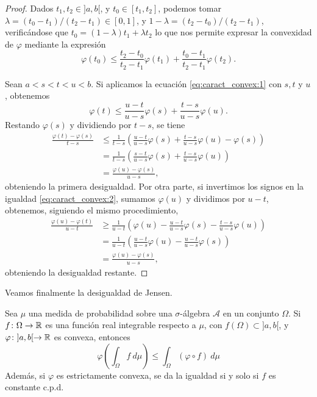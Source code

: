 \documentclass{book}
\begin{document}
\begin{proof}
	Dados $t_1,t_2 \in ]a,b[$, y $t_0 \in [t_1,t_2]$, podemos tomar $\lambda = (t_0 - t_1)/(t_2 - t_1) \in [0,1]$, y $1- \lambda = (t_2 - t_0)/(t_2 - t_1)$, verificándose que $t_0 = (1 - \lambda)t_1 + \lambda t_2$ lo que nos permite expresar la convexidad de $\varphi$ mediante la expresión
	\begin{equation} \label{eq:caract_convex:1}
		\varphi(t_0) \le \frac{t_2 - t_0}{t_2 - t_1}\varphi(t_1)+\frac{t_0 - t_1}{t_2 - t_1}\varphi(t_2). 
	\end{equation}

	Sean $a < s < t < u < b$. Si aplicamos la ecuación \ref{eq:caract_convex:1} con $s,t$ y $u$, obtenemos
	\begin{equation} \label{eq:caract_convex:2}
		\varphi(t) \le \frac{u - t}{u-s}\varphi(s) + \frac{t-s}{u-s}\varphi(u).
	\end{equation}
	Restando $\varphi(s)$ y dividiendo por $t-s$, se tiene
	\begin{align*}
		\frac{\varphi(t)-\varphi(s)}{t-s} &\le  \frac{1}{t-s}\left(\frac{u - t}{u-s}\varphi(s) + \frac{t-s}{u-s}\varphi(u) - \varphi(s)\right) \\
					&= \frac{1}{t-s}\left(\frac{s-t}{u-s}\varphi(s) + \frac{t-s}{u-s}\varphi(u) \right) \\
					&= \frac{\varphi(u)-\varphi(s)}{u - s},
	\end{align*}
	obteniendo la primera desigualdad. Por otra parte, si invertimos los signos en la igualdad \ref{eq:caract_convex:2}, sumamos $\varphi(u)$ y dividimos por $u -t$, obtenemos, siguiendo el mismo procedimiento,
	\begin{align*}
		\frac{\varphi(u)-\varphi(t)}{u - t} &\ge \frac{1}{u-t}\left( \varphi(u) - \frac{u-t}{u-s}\varphi(s) - \frac{t-s}{u-s}\varphi(u)\right) \\
				&= \frac{1}{u-t}\left( \frac{u-t}{u-s}\varphi(u) - \frac{u-t}{u-s}\varphi(s) \right) \\
				&= \frac{\varphi(u) - \varphi(s)}{u-s},
	\end{align*}
	obteniendo la desigualdad restante.
\end{proof}

Veamos finalmente la desigualdad de Jensen.

\begin{thm}
	Sea $\mu$ una medida de probabilidad sobre una $\sigma$-álgebra $\mathcal{A}$ en un conjunto $\Omega$. Si $f\colon \Omega \to \mathbb{R}$ es una función real integrable respecto a $\mu$, con $f(\Omega) \subset ]a,b[$, y $\varphi\colon ]a,b[ \to \mathbb{R}$ es convexa, entonces
	\begin{equation}
		\varphi\left(\int_{\Omega}f\ d\mu\right) \le \int_{\Omega}(\varphi \circ f)\ d\mu
	\end{equation}
	Además, si $\varphi$ es estrictamente convexa, se da la igualdad si y solo si $f$ es constante c.p.d.
\end{thm}
\end{document}
